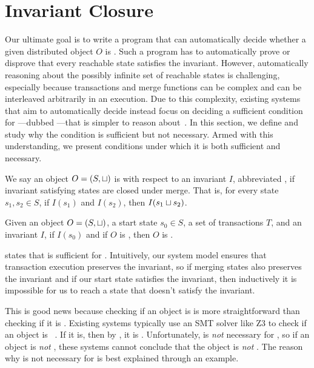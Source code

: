 \section{Invariant Closure}
Our ultimate goal is to write a program that can automatically decide whether a
given distributed object $O$ is \sTIconfluent{}. Such a program has to
automatically prove or disprove that every reachable state satisfies the
invariant. However, automatically reasoning about the possibly infinite set of
reachable states is challenging, especially because transactions and merge
functions can be complex and can be interleaved arbitrarily in an execution.
Due to this complexity, existing systems that aim to automatically decide
\invariantconfluence{} instead focus on deciding a sufficient condition for
\invariantconfluence{}---dubbed ---that is simpler to
reason about~\cite{li2012making, li2014automating}. In this section, we define
\invariantclosure{} and study why the condition is sufficient but not necessary.
Armed with this understanding, we present conditions under which it is both
sufficient and necessary.

We say an object $O = (S, \sqcup)$ is  with respect to
an invariant $I$, abbreviated , if invariant satisfying
states are closed under merge. That is, for every state $s_1, s_2 \in S$, if
$I(s_1)$ and $I(s_2)$, then $I(s_1 \sqcup s_2)$.

\begin{theorem}
  Given an object $O = (S, \sqcup)$, a start state $s_0 \in S$, a set of
  transactions $T$, and an invariant $I$, if $I(s_0)$ and if $O$ is \Iclosed{},
  then $O$ is \sTIconfluent{}.
\end{theorem}

 states that \invariantclosure{} is
sufficient for \invariantconfluence{}. Intuitively, our system model ensures that
transaction execution preserves the invariant, so if merging states also
preserves the invariant and if our start state satisfies the invariant, then
inductively it is impossible for us to reach a state that doesn't satisfy the
invariant.

This is good news because checking if an object is \invariantclosed{} is more
straightforward than checking if it is \invariantconfluent{}. Existing systems
typically use an SMT solver like Z3 to check if an object is
\invariantclosed{}~\cite{de2008z3, balegas2015putting, gotsman2016cause}. If it
is, then by , it is \invariantconfluent{}.
Unfortunately, \invariantclosure{} is \emph{not} necessary for
\invariantconfluence{}, so if an object is \emph{not} \invariantclosed{}, these
systems cannot conclude that the object is \emph{not} \invariantconfluent{}. The
reason why \invariantclosure{} is not necessary for \invariantconfluence{} is best
explained through an example.

